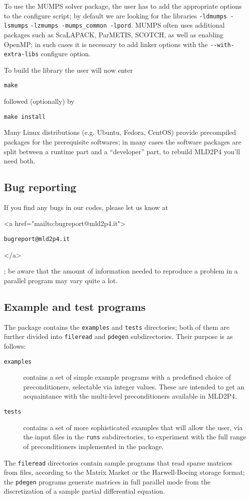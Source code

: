 To use the MUMPS solver package, 
the user has to add the appropriate options to the configure script;
by default we are looking for the libraries
\verb|-ldmumps -lsmumps| \verb|-lzmumps -mumps_common -lpord|.
MUMPS often uses additional packages such as ScaLAPACK, ParMETIS,
SCOTCH, as well as enabling OpenMP; in such cases it is necessary to
add linker options with the \verb|--with-extra-libs| configure option.

To build the library the user will now enter 
\begin{verbatim}
make
\end{verbatim}
followed (optionally) by 
\begin{verbatim}
make install
\end{verbatim}
Many Linux distributions (e.g. Ubuntu, Fedora, CentOS) provide
precompiled packages for the prerequisite softwares; in many cases the
software packages are split between a runtime part and a ``developer''
part, to rebuild MLD2P4 you'll need both. 

\subsection{Bug reporting}
If you find any bugs in our codes, please let us know at
\begin{rawhtml}
<a href="mailto:bugreport@mld2p4.it">
\end{rawhtml}
\texttt{bugreport@mld2p4.it}
\begin{rawhtml}
</a>
\end{rawhtml}
; be aware that  
the amount of information needed to reproduce a problem in a parallel
program may vary quite a lot.
\subsection{Example and test programs\label{sec:ex_and_test}}
The package contains the \verb|examples| and \verb|tests| directories;
both of them are further divided into \verb|fileread| and
\verb|pdegen| subdirectories. Their purpose is as follows:
\begin{description}
\item[\tt examples] contains a set of simple example programs with a
  predefined choice of preconditioners, selectable via integer
  values. These are intended to get an acquaintance with the
  multi-level preconditioners available in MLD2P4.
\item[\tt tests] contains a set of more sophisticated examples that
  will allow the user, via the input files in the \verb|runs|
  subdirectories, to experiment with the full range of preconditioners
  implemented in the package.
\end{description}
The \verb|fileread| directories contain sample programs that read
sparse matrices from files, according to the Matrix Market or the
Harwell-Boeing storage format; the \verb|pdegen| programs generate
matrices in full parallel mode from the discretization of a sample partial
differential equation. 
